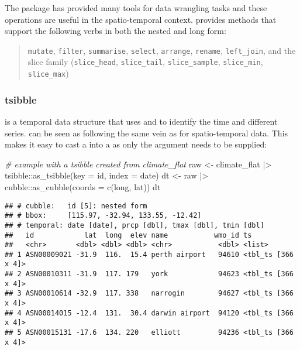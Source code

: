 \documentclass{article}
\newenvironment{Shaded}{\begin{snugshade}}{\end{snugshade}}
\newcommand{\AttributeTok}[1]{\textcolor[rgb]{0.77,0.63,0.00}{#1}}
\newcommand{\CommentTok}[1]{\textcolor[rgb]{0.56,0.35,0.01}{\textit{#1}}}
\newcommand{\FunctionTok}[1]{\textcolor[rgb]{0.00,0.00,0.00}{#1}}
\newcommand{\NormalTok}[1]{#1}
\newcommand{\OtherTok}[1]{\textcolor[rgb]{0.56,0.35,0.01}{#1}}
\newcommand{\SpecialCharTok}[1]{\textcolor[rgb]{0.00,0.00,0.00}{#1}}
\begin{document}
The  package has provided many tools for data wrangling tasks and these operations are useful in the spatio-temporal context.  provides methods that support the following  verbs in both the nested and long form:

\begin{quote}
\texttt{mutate}, \texttt{filter}, \texttt{summarise}, \texttt{select}, \texttt{arrange}, \texttt{rename}, \texttt{left\_join}, and the slice family (\texttt{slice\_head}, \texttt{slice\_tail}, \texttt{slice\_sample}, \texttt{slice\_min}, \texttt{slice\_max})
\end{quote}

\hypertarget{tsibble}{%
\subsubsection{tsibble}\label{tsibble}}

 is a temporal data structure that uses  and  to identify the time and different series.  can be seen as following the same vein as  for spatio-temporal data. This makes it easy to cast a  into a  as only the  argument needs to be supplied:

\begin{Shaded}
\begin{Highlighting}[]
\CommentTok{\# example with a tsibble created from climate\_flat}
\NormalTok{raw }\OtherTok{\textless{}{-}}\NormalTok{ climate\_flat }\SpecialCharTok{|\textgreater{}}\NormalTok{ tsibble}\SpecialCharTok{::}\FunctionTok{as\_tsibble}\NormalTok{(}\AttributeTok{key =}\NormalTok{ id, }\AttributeTok{index =}\NormalTok{ date)}
\NormalTok{dt }\OtherTok{\textless{}{-}}\NormalTok{  raw }\SpecialCharTok{|\textgreater{}}\NormalTok{ cubble}\SpecialCharTok{::}\FunctionTok{as\_cubble}\NormalTok{(}\AttributeTok{coords =} \FunctionTok{c}\NormalTok{(long, lat))}
\NormalTok{dt}
\end{Highlighting}
\end{Shaded}

\begin{verbatim}
## # cubble:   id [5]: nested form
## # bbox:     [115.97, -32.94, 133.55, -12.42]
## # temporal: date [date], prcp [dbl], tmax [dbl], tmin [dbl]
##   id            lat  long  elev name           wmo_id ts                
##   <chr>       <dbl> <dbl> <dbl> <chr>           <dbl> <list>            
## 1 ASN00009021 -31.9  116.  15.4 perth airport   94610 <tbl_ts [366 x 4]>
## 2 ASN00010311 -31.9  117. 179   york            94623 <tbl_ts [366 x 4]>
## 3 ASN00010614 -32.9  117. 338   narrogin        94627 <tbl_ts [366 x 4]>
## 4 ASN00014015 -12.4  131.  30.4 darwin airport  94120 <tbl_ts [366 x 4]>
## 5 ASN00015131 -17.6  134. 220   elliott         94236 <tbl_ts [366 x 4]>
\end{verbatim}
\end{document}
